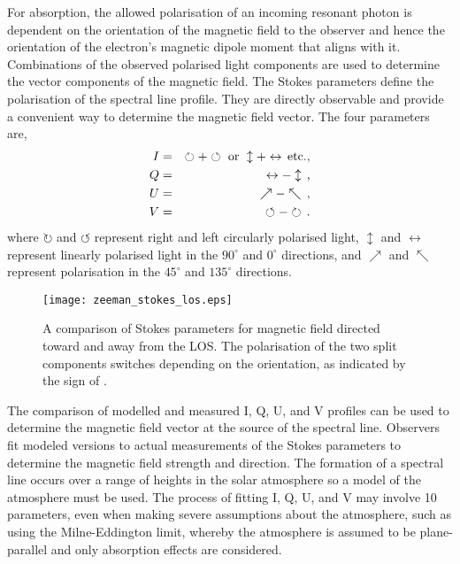 For absorption, the allowed polarisation of an incoming resonant photon is dependent on the orientation of the magnetic field to the observer and hence the orientation of the electron's magnetic dipole moment that aligns with it. Combinations of the observed polarised light components are used to determine the vector components of the magnetic field. The Stokes parameters \citep{Stokes:1851} define the polarisation of the spectral line profile. They are directly observable and provide a convenient way to determine the magnetic field vector. The four parameters are,
\begin{eqnarray}
I &=& \circlearrowright+\circlearrowleft \mbox{ or } \updownarrow+\leftrightarrow \mbox{\,etc.,} \\
Q &=& \leftrightarrow - \updownarrow \mbox{\,,} \\
U &=& \nearrow - \nwarrow \mbox{\,,} \\
V &=& \circlearrowleft - \circlearrowright \mbox{\,.}
\end{eqnarray}
where $\circlearrowright$ and $\circlearrowleft$ represent right and left circularly polarised light, $\updownarrow$ and $\leftrightarrow$ represent linearly polarised light in the $90^\circ$ and $0^\circ$ directions, and $\nearrow$ and $\nwarrow$ represent polarisation in the $45^\circ$ and $135^\circ$ directions. 

\begin{figure}[!t]
\centerline{\texttt{[image: zeeman\_stokes\_los.eps]}}
\caption[A comparison of Stokes parameters for different magnetic fields.]{A comparison of Stokes parameters for magnetic field directed toward and away from the LOS. The polarisation of the two split components switches depending on the orientation, as indicated by the sign of .}
\label{fig:zeemanstokes}
\end{figure}

The comparison of modelled and measured I, Q, U, and V profiles can be used to determine the magnetic field vector at the source of the spectral line. Observers fit modeled versions to actual measurements of the Stokes parameters to determine the magnetic field strength and direction. The formation of a spectral line occurs over a range of heights in the solar atmosphere so a model of the atmosphere must be used. The process of fitting I, Q, U, and V may involve 10 parameters, even when making severe assumptions about the atmosphere, such as using the Milne-Eddington limit, whereby the atmosphere is assumed to be plane-parallel and only absorption effects are considered. 

